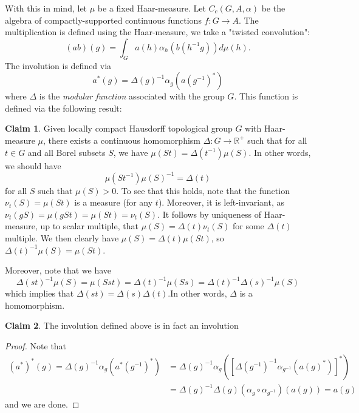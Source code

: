 \documentclass[aps,pra,showpacs,notitlepage,onecolumn,superscriptaddress,nofootinbib]{revtex4-1}
\theoremstyle{definition}
\newtheorem{claim}{Claim}[section]
\begin{document}
With this in mind, let $\mu$ be a fixed Haar-measure. Let $C_c(G, A, \alpha)$ be the algebra of compactly-supported continuous functions $f : G \rightarrow A$. The multiplication is defined using the Haar-measure, we take a "twisted convolution":
\begin{equation}
    (ab)(g) = \int_{G} a(h) \alpha_h( b(h^{-1} g)) d\mu(h).
\end{equation}
The involution is defined via
\begin{equation}
    a^{*}(g) = \Delta(g)^{-1} \alpha_g(a(g^{-1})^{*})
\end{equation}
where $\Delta$ is the \emph{modular function} associated with the group $G$. This function is defined via the following result:
\begin{claim}
   Given locally compact Hausdorff topological group $G$ with Haar-measure $\mu$, there exists a continuous homomorphism $\Delta : G \rightarrow \mathbb{R}^{+}$ such that for all $t \in G$ and all Borel subsets $S$, we have $\mu(S t) = \Delta(t^{-1}) \mu(S)$. In other words, we should have
   \begin{equation}
       \mu(St^{-1}) \mu(S)^{-1} = \Delta(t)
   \end{equation}
   for all $S$ such that $\mu(S) > 0$. To see that this holds, note that the function $\nu_t(S) = \mu(St)$ is a measure (for any $t$). Moreover, it is left-invariant, as $\nu_t(gS) = \mu(gSt) = \mu(St) = \nu_t(S)$. It follows by uniqueness of Haar-measure, up to scalar multiple, that $\mu(S) = \Delta(t) \nu_t(S)$ for some $\Delta(t)$ multiple. We then clearly have $\mu(S) = \Delta(t) \mu(St)$, so $\Delta(t)^{-1} \mu(S) = \mu(St)$.

   Moreover, note that we have
   \begin{equation}
       \Delta(st)^{-1} \mu(S) = \mu(Sst) = \Delta(t)^{-1} \mu(Ss) = \Delta(t)^{-1} \Delta(s)^{-1} \mu(S)
   \end{equation}
   which implies that $\Delta(st) = \Delta(s) \Delta(t)$.In other words, $\Delta$ is a homomorphism.
\end{claim}

\begin{claim}
    The involution defined above is in fact an involution
\end{claim}
\begin{proof}
    Note that
    \begin{align}
        (a^{*})^{*}(g) = \Delta(g)^{-1} \alpha_g(a^{*}(g^{-1})^{*}) &= \Delta(g)^{-1} \alpha_g \left( \left[ \Delta(g^{-1})^{-1} \alpha_{g^{-1}}(a(g)^{*}) \right]^{*}\right)
        \\ &= \Delta(g)^{-1} \Delta(g) (\alpha_{g} \circ \alpha_{g^{-1}})(a(g)) = a(g)
    \end{align}
    and we are done.
\end{proof}
\end{document}
